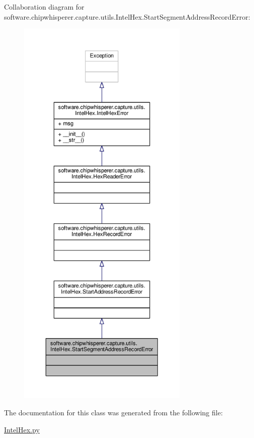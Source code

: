Collaboration diagram for software.\+chipwhisperer.\+capture.\+utils.\+Intel\+Hex.\+Start\+Segment\+Address\+Record\+Error\+:\nopagebreak
\begin{figure}[H]
\begin{center}
\leavevmode
\includegraphics[height=550pt]{df/dfd/classsoftware_1_1chipwhisperer_1_1capture_1_1utils_1_1IntelHex_1_1StartSegmentAddressRecordError__coll__graph}
\end{center}
\end{figure}


The documentation for this class was generated from the following file\+:\begin{DoxyCompactItemize}
\item 
\hyperlink{IntelHex_8py}{Intel\+Hex.\+py}\end{DoxyCompactItemize}

